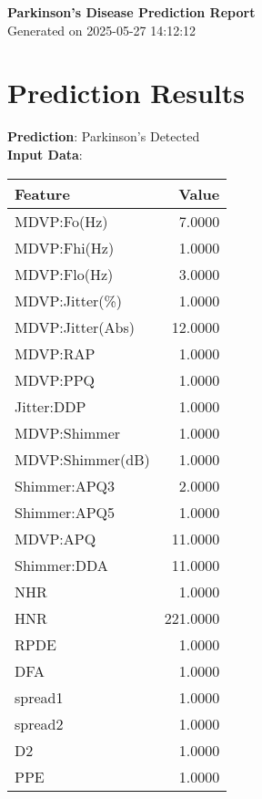 \documentclass[a4paper,10pt]{article}
\begin{document}
\begin{center}
    \textbf{\Large Parkinson's Disease Prediction Report} \\
    \vspace{0.2cm}
    Generated on 2025-05-27 14:12:12
\end{center}

\section*{Prediction Results}

\textbf{Prediction}: Parkinson's Detected \\
\vspace{0.2cm}
\textbf{Input Data}: \\
\begin{tabular}{lr}
\toprule
Feature & Value \\
\midrule
MDVP:Fo(Hz) & 7.0000 \\ 
MDVP:Fhi(Hz) & 1.0000 \\ 
MDVP:Flo(Hz) & 3.0000 \\ 
MDVP:Jitter(\%) & 1.0000 \\ 
MDVP:Jitter(Abs) & 12.0000 \\ 
MDVP:RAP & 1.0000 \\ 
MDVP:PPQ & 1.0000 \\ 
Jitter:DDP & 1.0000 \\ 
MDVP:Shimmer & 1.0000 \\ 
MDVP:Shimmer(dB) & 1.0000 \\ 
Shimmer:APQ3 & 2.0000 \\ 
Shimmer:APQ5 & 1.0000 \\ 
MDVP:APQ & 11.0000 \\ 
Shimmer:DDA & 11.0000 \\ 
NHR & 1.0000 \\ 
HNR & 221.0000 \\ 
RPDE & 1.0000 \\ 
DFA & 1.0000 \\ 
spread1 & 1.0000 \\ 
spread2 & 1.0000 \\ 
D2 & 1.0000 \\ 
PPE & 1.0000 \\ 

\bottomrule
\end{tabular}
\end{document}
